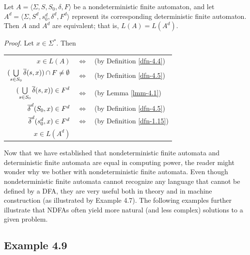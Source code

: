 \begin{thm}\label{thm-4.1}
Let $A=\langle\Sigma,S,S_0,\delta,F\rangle$ be a nondeterministic finite
automaton, and let $A^d=\langle\Sigma,S^d,s^d_0,\delta^d,F^d\rangle$ represent
its corresponding deterministic finite automaton. Then $A$ and $A^d$ are
equivalent; that is, $L(A) = L(A^d)$.

\emph{Proof.} Let $x \in \Sigma^*$. Then
\begin{center}\begin{tabular}{rcl}
$x \in L(A)$ & $\Leftrightarrow$ & (by Definition \ref{dfn-4.4}) \\
$(\bigcup\limits_{s \in S_0}\overline{\delta}(s,x)) \cap F \not= \emptyset$ &
	$\Leftrightarrow$ & (by Definition \ref{dfn-4.5}) \\
$(\bigcup\limits_{s\in S_0}\overline{\delta}(s,x)) \in F^d$ & $\Leftrightarrow$ &
	(by Lemma \ref{lmm-4.1}) \\
$\overline{\delta}^d(S_0,x) \in F^d$ & $\Leftrightarrow$ & (by Definition \ref{dfn-4.5}) \\
$\overline{\delta}^d(s^d_0,x) \in F^d$ & $\Leftrightarrow$ & (by Definition \ref{dfn-1.15}) \\
$x \in L(A^d)$ &&
\end{tabular}\end{center}
\end{thm}

Now that we have established that nondeterministic finite automata and
deterministic finite automata are equal in computing power, the reader might
wonder why we bother with nondeterministic finite automata. Even though
nondeterministic finite automata cannot recognize any language that cannot be
defined by a DFA, they are very useful both in theory and in machine
construction (as illustrated by Example 4.7). The following examples further
illustrate that NDFAs often yield more natural (and less complex) solutions to a
given problem.

\subsection*{Example 4.9}

